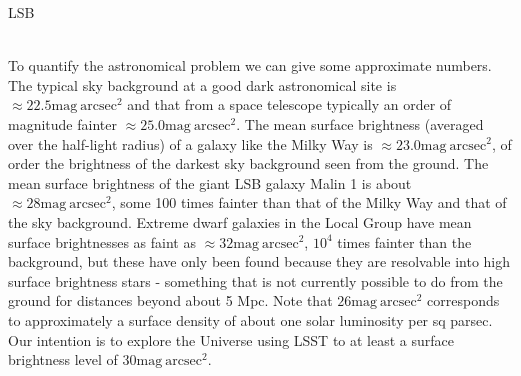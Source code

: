 \begin{tasklist}{LSB}
\begin{task}
{\\
To quantify the astronomical problem we can give some approximate numbers. The typical sky background at a good dark astronomical site is $\approx22.5\mathrm{mag}~\mathrm{arcsec}^2$ and that from a space telescope typically an order of magnitude fainter $\approx25.0\mathrm{mag}~\mathrm{arcsec}^2$. The mean surface brightness (averaged over the half-light radius) of a galaxy like the Milky Way is $\approx23.0\mathrm{mag}~\mathrm{arcsec}^2$, of order the brightness of the darkest sky background seen from the ground. The mean surface brightness of the giant LSB galaxy Malin 1 is about $\approx28\mathrm{mag}~\mathrm{arcsec}^2$, some 100 times fainter than that of the Milky Way and that of the sky background. Extreme dwarf galaxies in the Local Group have mean surface brightnesses as faint as $\approx32\mathrm{mag}~\mathrm{arcsec}^2$, $10^4$ times fainter than the background, but these have only been found because they are resolvable into high surface brightness stars - something that is not currently possible to do from the ground for distances beyond about 5 Mpc. Note that $26\mathrm{mag}~\mathrm{arcsec}^2$ corresponds to approximately a surface density of about one solar luminosity per sq parsec. Our intention is to explore the Universe using LSST to at least a surface brightness level of $30\mathrm{mag}~\mathrm{arcsec}^2$.
}
\end{task}
\end{tasklist}
